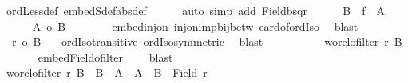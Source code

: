 \begin{isabellebody}
\ ordLess{\isacharunderscore}{\kern0pt}def\ embedS{\isacharunderscore}{\kern0pt}def{\isacharbrackleft}{\kern0pt}abs{\isacharunderscore}{\kern0pt}def{\isacharbrackright}{\kern0pt}\isanewline
\ \ \ \ \isamarkupfalse%
\ {\isacharparenleft}{\kern0pt}auto\ simp\ add{\isacharcolon}{\kern0pt}\ Field{\isacharunderscore}{\kern0pt}bsqr{\isacharparenright}{\kern0pt}\isanewline
\ \ \ \ \isamarkupfalse%
\ {\isacharquery}{\kern0pt}B\ {\isacharequal}{\kern0pt}\ {\isachardoublequoteopen}f\ {\isacharbackquote}{\kern0pt}\ {\isacharquery}{\kern0pt}A{\isachardoublequoteclose}\isanewline
\ \ \ \ \isamarkupfalse%
\ {\isachardoublequoteopen}{\isacharbar}{\kern0pt}{\isacharquery}{\kern0pt}A{\isacharbar}{\kern0pt}\ {\isacharequal}{\kern0pt}o\ {\isacharbar}{\kern0pt}{\isacharquery}{\kern0pt}B{\isacharbar}{\kern0pt}{\isachardoublequoteclose}\isanewline
\ \ \ \ \isamarkupfalse%
\ {}\ {}\ embed{\isacharunderscore}{\kern0pt}inj{\isacharunderscore}{\kern0pt}on\ inj{\isacharunderscore}{\kern0pt}on{\isacharunderscore}{\kern0pt}imp{\isacharunderscore}{\kern0pt}bij{\isacharunderscore}{\kern0pt}betw\ card{\isacharunderscore}{\kern0pt}of{\isacharunderscore}{\kern0pt}ordIso\ \isamarkupfalse%
\ blast\isanewline
\ \ \ \ \isamarkupfalse%
\ {}{\isacharcolon}{\kern0pt}\ {\isachardoublequoteopen}r\ {\isacharequal}{\kern0pt}o\ {\isacharbar}{\kern0pt}{\isacharquery}{\kern0pt}B{\isacharbar}{\kern0pt}{\isachardoublequoteclose}\ \isamarkupfalse%
\ {}\ ordIso{\isacharunderscore}{\kern0pt}transitive\ ordIso{\isacharunderscore}{\kern0pt}symmetric\ \isamarkupfalse%
\ blast\isanewline
\ \ \ \ \isanewline
\ \ \ \ \isamarkupfalse%
\ {\isachardoublequoteopen}wo{\isacharunderscore}{\kern0pt}rel{\isachardot}{\kern0pt}ofilter\ {\isacharquery}{\kern0pt}r{\isacharprime}{\kern0pt}\ {\isacharquery}{\kern0pt}B{\isachardoublequoteclose}\isanewline
\ \ \ \ \isamarkupfalse%
\ {}\ embed{\isacharunderscore}{\kern0pt}Field{\isacharunderscore}{\kern0pt}ofilter\ {}\ {}\ \isamarkupfalse%
\ blast\isanewline
\ \ \ \ \isamarkupfalse%
\ {\isachardoublequoteopen}wo{\isacharunderscore}{\kern0pt}rel{\isachardot}{\kern0pt}ofilter\ {\isacharquery}{\kern0pt}r{\isacharprime}{\kern0pt}\ {\isacharquery}{\kern0pt}B\ {\isasymand}\ {\isacharquery}{\kern0pt}B\ {\isasymnoteq}\ {\isacharquery}{\kern0pt}A\ {\isasymtimes}\ {\isacharquery}{\kern0pt}A\ {\isasymand}\ {\isacharquery}{\kern0pt}B\ {\isasymnoteq}\ Field\ {\isacharquery}{\kern0pt}r{\isacharprime}{\kern0pt}{\isachardoublequoteclose}\isanewline

\end{isabellebody}

